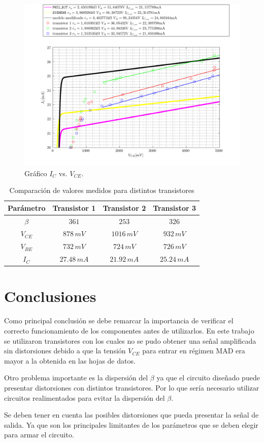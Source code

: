 \documentclass[10pt,spanish,a4paper,openany,notitlepage]{article}
\begin{document}
\begin{figure}[H]
\centering
\includegraphics[scale=0.8]{./imagenes/IcvsVce_25mA.pdf}
\caption{Gráfico $I_C$ vs. $V_{CE}$.}
\label{fig:ic_vce}
\end{figure}

\begin{table}[H]
\centering
\begin{tabular}{|c|c|c|c|}
\hline
Parámetro & Transistor 1 & Transistor 2 & Transistor 3 \\
\hline
$\beta$ & $361$ & $253$ & $326$ \\
\hline
$V_{CE}$ & $878\, \unit{mV}$ & $1016\, \unit{mV}$ & $932\, \unit{mV}$ \\
\hline
$V_{BE}$ & $732\, \unit{mV}$ & $724\, \unit{mV}$ & $726\, \unit{mV}$ \\
\hline
$I_C$ & $27.48\, \unit{mA}$ & $21.92\, \unit{mA}$ & $25.24\, \unit{mA}$ \\
\hline
\end{tabular}
\caption{Comparación de valores medidos para distintos transistores}
\label{table:comparacion_medicion}
\end{table}

\section{Conclusiones}

Como principal conclusión se debe remarcar la importancia de verificar
el correcto funcionamiento de los componentes antes de utilizarlos. En
este trabajo se utilizaron transistores con los cuales no se pudo obtener
una señal amplificada sin distorsiones debido a que la tensión $V_{CE}$
para entrar en régimen MAD era mayor a la obtenida en las hojas de datos.

Otro problema importante es la dispersión del $\beta$ ya que el circuito
diseñado puede presentar distorsiones con distintos transistores. Por
lo que sería necesario utilizar circuitos realimentados para evitar la
dispersión del $\beta$.

Se deben tener en cuenta las posibles distorsiones que pueda presentar
la señal de salida. Ya que son los principales limitantes de los parámetros
que se deben elegir para armar el circuito.
\end{document}
